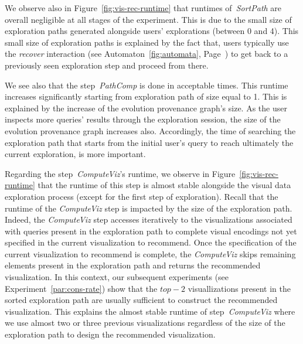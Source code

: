 We observe also in Figure~\ref{fig:vis-rec-runtime} that runtimes of~\emph{SortPath} are overall negligible at all stages of the experiment.
This is due to the small size of exploration paths generated alongside users' explorations (between 0 and 4). 
This small size of exploration paths is explained by the fact that, users typically use the \emph{recover} interaction (see Automaton~\ref{fig:automata}, Page~\pageref{fig:automata}) to get back to a previously seen exploration step and proceed from there.


We see also that the step~\emph{PathComp} is done in acceptable times. This runtime increases significantly starting from exploration path of size equal to 1.
This is explained by the increase of the evolution provenance graph's size. As the user inspects more queries' results through the exploration session, the size of the evolution provenance graph increases also. Accordingly, the time of searching the exploration path that starts from the initial user's query to reach ultimately the current exploration, is more important.



Regarding the step~\emph{ComputeViz}'s runtime, we observe in Figure~\ref{fig:vis-rec-runtime} that the runtime of this step is almost stable alongside the visual data exploration process (except for the first step of exploration). 
Recall that the runtime of the \emph{ComputeViz} step is impacted by the size of the exploration path. Indeed, the \emph{ComputeViz} step accesses iteratively to the visualizations associated with queries present in the exploration path to complete visual encodings not yet specified in the current visualization to recommend. Once the specification of the current visualization to recommend is complete, the \emph{ComputeViz} skips remaining elements present in the exploration path and returns the recommended visualization.
In this context, our subsequent experiments (see Experiment~\ref{par:cons-rate}) show that the $top-2$ visuallizations present in the sorted exploration path are usually sufficient to construct the recommended visualization.
This explains the almost stable runtime of step~\emph{ComputeViz} where we use almost two or three previous visualizations regardless of the size of the exploration path to design the recommended visualization.






